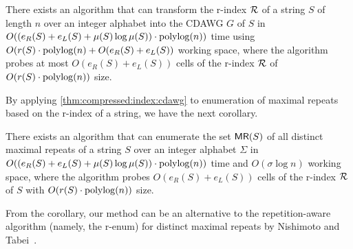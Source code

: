 \documentclass{article}
\begin{document}
\begin{theorem}\label{thm:compressed:index:cdawg}
There exists an algorithm that can transform the r-index $\mathcal{R}$ of a string $S$ of length $n$ over an integer alphabet into the CDAWG $G$ of $S$
  in $O((e_R(S) + e_L(S) + \mu(S)\log\mu(S))\cdot \operatorname{\mathrm{polylog}}(n))$ time
  using
  $O(r(S)\cdot \operatorname{\mathrm{polylog}}(n) + O(e_R(S) + e_L(S))$ working space,
  where the algorithm probes at most $O(e_R(S) + e_L(S))$ cells of the r-index $\mathcal{R}$ of $O(r(S)\cdot\operatorname{\mathrm{polylog}}(n))$ size. 
\end{theorem}

By applying \cref{thm:compressed:index:cdawg} to enumeration of maximal repeats based on the r-index of a string, we have the next corollary. 

\begin{corollary}\label{cor:main:index:maxrep}
  There exists an algorithm that can enumerate the set $\textsf{MR}(S)$ of all distinct maximal repeats of a string $S$ over an integer alphabet $\Sigma$ in 
  $O((e_R(S)+e_L(S) + \mu(S)\log \mu(S))\cdot \operatorname{\mathrm{polylog}}(n))$
  time 
  and $O(\sigma \log n)$ working space, 
  where the algorithm probes  $O(e_R(S) + e_L(S))$ cells of the r-index $\mathcal{R}$ of $S$ with $O(r(S)\cdot\operatorname{\mathrm{polylog}}(n))$ size. 
\end{corollary}



From the corollary, our method can be an alternative to the repetition-aware algorithm (namely, the r-enum) for distinct maximal repeats by Nishimoto and Tabei~\cite{nishimoto:cpm2021enum}.


\end{document}
